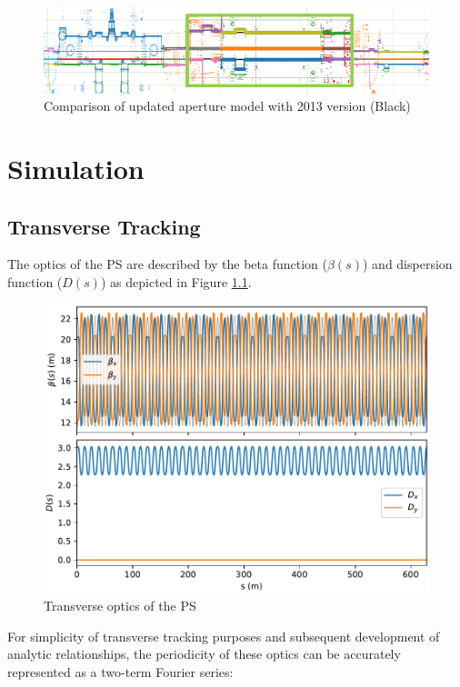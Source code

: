 \begin{figure}
    \centering
    \includegraphics{figs/aperture_comparison.PNG}
    \caption{Comparison of updated aperture model with 2013 version (Black)}
    \label{fig:ps_septa}
\end{figure}

\chapter{Simulation}

\section{Transverse Tracking}

The optics of the PS are described by the beta function ($\beta(s)$) and dispersion function ($D(s)$) as depicted in Figure \ref{fig:ps_optics}.

\begin{figure}
    \centering
    \includegraphics{figs/ps_optics.pdf}
    \caption{Transverse optics of the PS}
    \label{fig:ps_optics}
\end{figure}

For simplicity of transverse tracking purposes and subsequent development of analytic relationships, the periodicity of these optics can be accurately represented as a two-term Fourier series:


